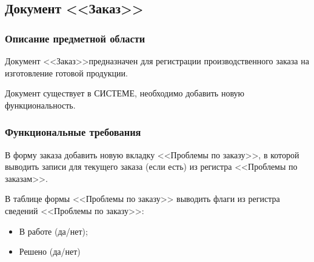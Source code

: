 \subsection{Документ <<Заказ>>}
\label{doc:Order}
\renewcommand{\curobject}{<<Заказ>>}

\subsubsection{Описание предметной области}

Документ \curobject предназначен для регистрации производственного заказа на изготовление готовой продукции.

Документ существует в СИСТЕМЕ, необходимо добавить новую функциональность.


\subsubsection{Функциональные требования}



В форму заказа добавить новую вкладку <<Проблемы по заказу>>, в которой выводить записи для текущего заказа (если есть) из регистра <<Проблемы по заказам>>.

В таблице формы <<Проблемы по заказу>> выводить флаги из регистра сведений <<Проблемы по заказу>>:
\begin{itemize}
    \item В работе (да/нет); 
    \item Решено (да/нет)
\end{itemize}

